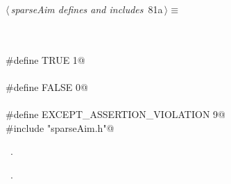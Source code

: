 \documentclass{article}
\begin{document}
\begin{flushleft} \small
\begin{minipage}{\linewidth}\label{scrap134}\raggedright\small
{} $\langle\,${\itshape sparseAim defines and includes}\nobreak\ {\footnotesize {81a}}$\,\rangle\equiv$
\vspace{-1ex}
\begin{list}{}{} \item
\mbox{}\verb@@\\
\mbox{}\verb@@\\
\mbox{}\verb@#define TRUE 1@\\
\mbox{}\verb@@\\
\mbox{}\verb@#define FALSE 0@\\
\mbox{}\verb@@\\
\mbox{}\verb@#define EXCEPT_ASSERTION_VIOLATION 9@\\
\mbox{}\verb@#include "sparseAim.h"@\\
\mbox{}\verb@@{\NWsep}
\end{list}
\vspace{-1.5ex}
\footnotesize
\begin{list}{}{\setlength{\itemsep}{-\parsep}\setlength{\itemindent}{-\leftmargin}}
\item \NWtxtMacroDefBy\ .
\item \NWtxtMacroRefIn\ .

\item{}
\end{list}
\end{minipage}\vspace{4ex}
\end{flushleft}
\end{document}
